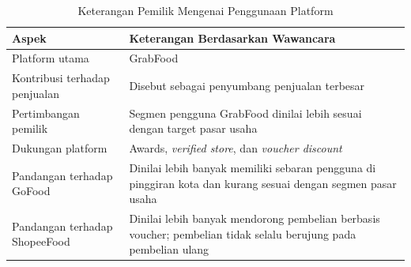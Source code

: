 \begin{table}[h!]
    \centering
    \caption{Keterangan Pemilik Mengenai Penggunaan Platform}
    \label{tab:prasurvey2_grabfood}
    \begin{tabularx}{\textwidth}{lY}
        \toprule
        \textbf{Aspek}                & \textbf{Keterangan Berdasarkan Wawancara}                                                                       \\
        \midrule
        Platform utama                & GrabFood                                                                                                        \\
        Kontribusi terhadap penjualan & Disebut sebagai penyumbang penjualan terbesar                                                                   \\
        Pertimbangan pemilik          & Segmen pengguna GrabFood dinilai lebih sesuai dengan target pasar usaha                                         \\
        Dukungan platform             & Awards, \textit{verified store}, dan \textit{voucher discount}                                                  \\
        Pandangan terhadap GoFood     & Dinilai lebih banyak memiliki sebaran pengguna di pinggiran kota dan kurang sesuai dengan segmen pasar usaha    \\
        Pandangan terhadap ShopeeFood & Dinilai lebih banyak mendorong pembelian berbasis voucher; pembelian tidak selalu berujung pada pembelian ulang \\
        \bottomrule
    \end{tabularx}
\end{table}

